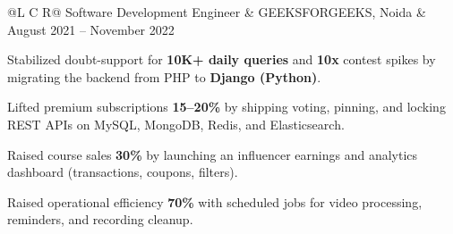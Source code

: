 \vspace{0.1ex}
\noindent
\begin{tabularx}{\textwidth}{@{}L C R@{}}
\textcolor{role}{Software Development Engineer} & \textcolor{company}{GEEKSFORGEEKS, Noida} & \textcolor{date}{August 2021 -- November 2022}\\
\end{tabularx}
\vspace{-3.2ex}
\begin{zitemize}
    \item Stabilized doubt-support for \textbf{10K+ daily queries} and \textbf{10x} contest spikes by migrating the backend from PHP to \textbf{Django (Python)}.
    \item Lifted premium subscriptions \textbf{15--20\%} by shipping voting, pinning, and locking REST APIs on MySQL, MongoDB, Redis, and Elasticsearch.
    \item Raised course sales \textbf{30\%} by launching an influencer earnings and analytics dashboard (transactions, coupons, filters).
    \item Raised operational efficiency \textbf{70\%} with scheduled jobs for video processing, reminders, and recording cleanup.
\end{zitemize}
